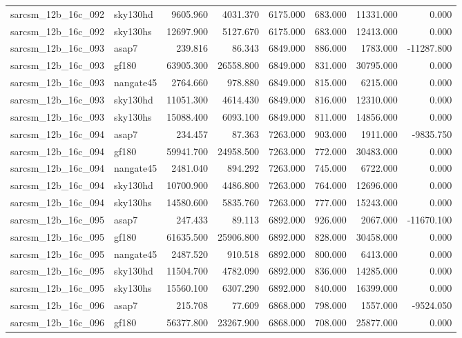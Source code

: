 \begin{tabular}{llrrrrrr}
sarcsm\_12b\_16c\_092 & sky130hd & 9605.960 & 4031.370 & 6175.000 & 683.000 & 11331.000 & 0.000 \\
sarcsm\_12b\_16c\_092 & sky130hs & 12697.900 & 5127.670 & 6175.000 & 683.000 & 12413.000 & 0.000 \\
sarcsm\_12b\_16c\_093 & asap7 & 239.816 & 86.343 & 6849.000 & 886.000 & 1783.000 & -11287.800 \\
sarcsm\_12b\_16c\_093 & gf180 & 63905.300 & 26558.800 & 6849.000 & 831.000 & 30795.000 & 0.000 \\
sarcsm\_12b\_16c\_093 & nangate45 & 2764.660 & 978.880 & 6849.000 & 815.000 & 6215.000 & 0.000 \\
sarcsm\_12b\_16c\_093 & sky130hd & 11051.300 & 4614.430 & 6849.000 & 816.000 & 12310.000 & 0.000 \\
sarcsm\_12b\_16c\_093 & sky130hs & 15088.400 & 6093.100 & 6849.000 & 811.000 & 14856.000 & 0.000 \\
sarcsm\_12b\_16c\_094 & asap7 & 234.457 & 87.363 & 7263.000 & 903.000 & 1911.000 & -9835.750 \\
sarcsm\_12b\_16c\_094 & gf180 & 59941.700 & 24958.500 & 7263.000 & 772.000 & 30483.000 & 0.000 \\
sarcsm\_12b\_16c\_094 & nangate45 & 2481.040 & 894.292 & 7263.000 & 745.000 & 6722.000 & 0.000 \\
sarcsm\_12b\_16c\_094 & sky130hd & 10700.900 & 4486.800 & 7263.000 & 764.000 & 12696.000 & 0.000 \\
sarcsm\_12b\_16c\_094 & sky130hs & 14580.600 & 5835.760 & 7263.000 & 777.000 & 15243.000 & 0.000 \\
sarcsm\_12b\_16c\_095 & asap7 & 247.433 & 89.113 & 6892.000 & 926.000 & 2067.000 & -11670.100 \\
sarcsm\_12b\_16c\_095 & gf180 & 61635.500 & 25906.800 & 6892.000 & 828.000 & 30458.000 & 0.000 \\
sarcsm\_12b\_16c\_095 & nangate45 & 2487.520 & 910.518 & 6892.000 & 800.000 & 6413.000 & 0.000 \\
sarcsm\_12b\_16c\_095 & sky130hd & 11504.700 & 4782.090 & 6892.000 & 836.000 & 14285.000 & 0.000 \\
sarcsm\_12b\_16c\_095 & sky130hs & 15560.100 & 6307.290 & 6892.000 & 840.000 & 16399.000 & 0.000 \\
sarcsm\_12b\_16c\_096 & asap7 & 215.708 & 77.609 & 6868.000 & 798.000 & 1557.000 & -9524.050 \\
sarcsm\_12b\_16c\_096 & gf180 & 56377.800 & 23267.900 & 6868.000 & 708.000 & 25877.000 & 0.000 \\

\end{tabular}
